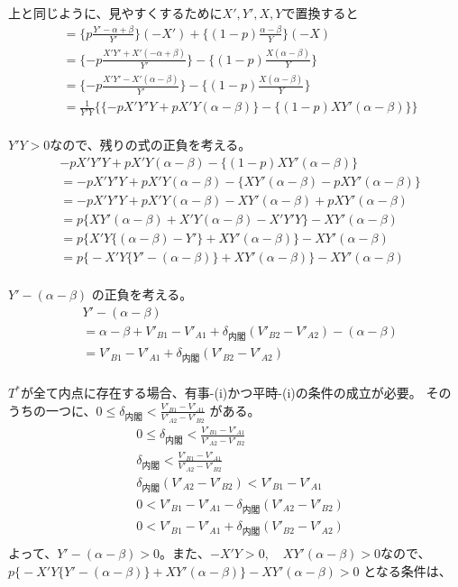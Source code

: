 \documentclass[main.tex]{subfiles}
\begin{document}
上と同じように、見やすくするために$X',Y',X,Y$で置換すると
\begin{align*}
    &= \{ p \frac{ Y'-\alpha+\beta }{ Y' } \}( -X' ) + \{(1-p) \frac{ \alpha-\beta }{ Y } \}(-X )\\[1em]
    &= \{ -p \frac{ X'Y' + X'(-\alpha+\beta) }{ Y' } \} - \{(1-p) \frac{ X(\alpha-\beta) }{ Y } \}\\[1em]
    &= \{ -p \frac{ X'Y' - X'(\alpha-\beta) }{ Y' } \} - \{(1-p) \frac{ X(\alpha-\beta) }{ Y } \}\\[1em]
    &= \frac{1}{Y'Y} \Big\{ \{ -p X'Y'Y + pX'Y(\alpha-\beta)  \} - \{(1-p) XY'(\alpha-\beta)  \}  \Big\} \\[1em]
\end{align*}

$Y'Y>0$なので、残りの式の正負を考える。
\begin{align*}
    &-p X'Y'Y + pX'Y(\alpha-\beta)  - \{(1-p) XY'(\alpha-\beta)  \}  \\[1em]
    &= -p X'Y'Y + pX'Y(\alpha-\beta)  - \{ XY'(\alpha-\beta) - pXY'(\alpha-\beta)  \}  \\[1em]
    &= -p X'Y'Y + pX'Y(\alpha-\beta)  - XY'(\alpha-\beta) + pXY'(\alpha-\beta)   \\[1em]
    &= p \{  XY'(\alpha-\beta)  + X'Y(\alpha-\beta) - X'Y'Y   \} - XY'(\alpha-\beta)\\[1em]
    &= p \Big\{  X'Y\{ (\alpha-\beta) - Y' \} +XY'(\alpha-\beta) \Big\} - XY'(\alpha-\beta)\\[1em]
    &= p \Big\{  -X'Y\{ Y' - (\alpha-\beta)  \} +XY'(\alpha-\beta) \Big\} - XY'(\alpha-\beta)\\
\end{align*}

$Y' - (\alpha-\beta)$ の正負を考える。
\begin{align*}
    &Y' - (\alpha-\beta)\\
    &= \alpha-\beta + V'_{B1}-V'_{A1} + \delta_{内閣}(V'_{B2} - V'_{A2}) - (\alpha-\beta) \\[1em]
    &=  V'_{B1}-V'_{A1} + \delta_{内閣}(V'_{B2} - V'_{A2})  \\[1em]
\end{align*}

$T^*$が全て内点に存在する場合、有事-(i)かつ平時-(i)の条件の成立が必要。
そのうちの一つに、$0 \le \delta_{内閣} < \frac{V'_{B1} - V'_{A1}}{V'_{A2} - V'_{B2}}$ がある。
\begin{align*}
    &0 \le \delta_{内閣} < \frac{V'_{B1} - V'_{A1}}{V'_{A2} - V'_{B2}}\\[1em]
    &\delta_{内閣} < \frac{V'_{B1} - V'_{A1}}{V'_{A2} - V'_{B2}}\\[1em]
    &\delta_{内閣}(V'_{A2} - V'_{B2}) < V'_{B1} - V'_{A1}\\[1em]
    & 0 < V'_{B1} - V'_{A1} - \delta_{内閣}(V'_{A2} - V'_{B2})\\[1em]
    & 0 < V'_{B1} - V'_{A1} + \delta_{内閣}(V'_{B2} - V'_{A2})\\[1em]
\end{align*}
よって、$Y' - (\alpha-\beta)>0$。また、$-X'Y>0, \quad XY'(\alpha-\beta)>0$なので、\\
$p \Big\{  -X'Y\{ Y' - (\alpha-\beta)  \} +XY'(\alpha-\beta) \Big\} - XY'(\alpha-\beta)>0$ となる条件は、
\end{document}
